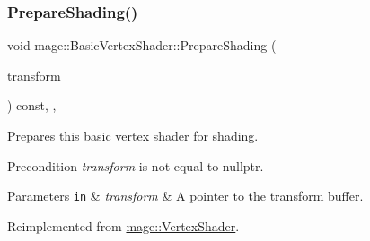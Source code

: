 \subsubsection{\texorpdfstring{Prepare\+Shading()}{PrepareShading()}}
{\footnotesize\ttfamily void mage\+::\+Basic\+Vertex\+Shader\+::\+Prepare\+Shading (\begin{DoxyParamCaption}\item[{I\+D3\+D11\+Buffer $\ast$}]{transform }\end{DoxyParamCaption}) const\hspace{0.3cm}{\ttfamily [final]}, {\ttfamily [override]}, {\ttfamily [virtual]}}

Prepares this basic vertex shader for shading.

\begin{DoxyPrecond}{Precondition}
{\itshape transform} is not equal to {\ttfamily nullptr}. 
\end{DoxyPrecond}

\begin{DoxyParams}[1]{Parameters}
\mbox{\tt in}  & {\em transform} & A pointer to the transform buffer. \\
\hline
\end{DoxyParams}


Reimplemented from \hyperlink{classmage_1_1_vertex_shader_a53f4b25241f6c5739724d421c9f29a36}{mage\+::\+Vertex\+Shader}.


